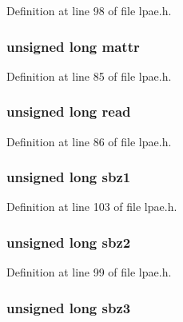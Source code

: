 \-Definition at line 98 of file lpae.\-h.

\hypertarget{structlpae__p2m__t_abb75a9f607e52a07db6a528672e0ccd6}{
\subsubsection[{mattr}]{\setlength{\rightskip}{0pt plus 5cm}unsigned long {\bf mattr}}}\label{structlpae__p2m__t_abb75a9f607e52a07db6a528672e0ccd6}


\-Definition at line 85 of file lpae.\-h.

\hypertarget{structlpae__p2m__t_a414a71904272e5b5fce01917028fb426}{
\subsubsection[{read}]{\setlength{\rightskip}{0pt plus 5cm}unsigned long {\bf read}}}\label{structlpae__p2m__t_a414a71904272e5b5fce01917028fb426}


\-Definition at line 86 of file lpae.\-h.

\hypertarget{structlpae__p2m__t_aaaf6b94202af054e3777a0fc8938ea85}{
\subsubsection[{sbz1}]{\setlength{\rightskip}{0pt plus 5cm}unsigned long {\bf sbz1}}}\label{structlpae__p2m__t_aaaf6b94202af054e3777a0fc8938ea85}


\-Definition at line 103 of file lpae.\-h.

\hypertarget{structlpae__p2m__t_af8da50342df58644c092236709963e4c}{
\subsubsection[{sbz2}]{\setlength{\rightskip}{0pt plus 5cm}unsigned long {\bf sbz2}}}\label{structlpae__p2m__t_af8da50342df58644c092236709963e4c}


\-Definition at line 99 of file lpae.\-h.

\hypertarget{structlpae__p2m__t_abec53fb8579fdb4fbbed7e95ca3433d1}{
\subsubsection[{sbz3}]{\setlength{\rightskip}{0pt plus 5cm}unsigned long {\bf sbz3}}}\label{structlpae__p2m__t_abec53fb8579fdb4fbbed7e95ca3433d1}


